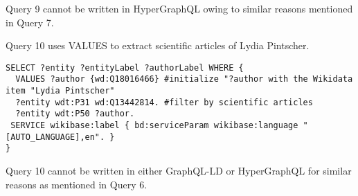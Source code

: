 Query 9 cannot be written in HyperGraphQL owing to similar reasons mentioned in Query 7.

Query 10 uses VALUES to extract scientific articles of Lydia Pintscher.

\begin{minipage}{\linewidth}
\begin{lstlisting}[label=listing:listing53, caption={Query 10}]
SELECT ?entity ?entityLabel ?authorLabel WHERE {
  VALUES ?author {wd:Q18016466} #initialize "?author with the Wikidata item "Lydia Pintscher"
  ?entity wdt:P31 wd:Q13442814. #filter by scientific articles
  ?entity wdt:P50 ?author.
 SERVICE wikibase:label { bd:serviceParam wikibase:language "[AUTO_LANGUAGE],en". }
}
\end{lstlisting}
\end{minipage}

Query 10 cannot be written in either GraphQL-LD or HyperGraphQL for similar reasons as mentioned in Query 6.


